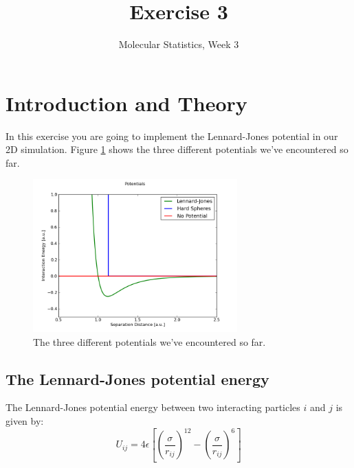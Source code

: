 \documentclass{article}
\title{Exercise 3}
\author{Molecular Statistics, Week 3}
\date{}
\begin{document}

\maketitle


\section{Introduction and Theory}



In this exercise you are going to implement the Lennard-Jones potential in our 2D simulation.
Figure \ref{fig:potentials} shows the three different potentials we've encountered so far.

\begin{figure}[h!]
\begin{center}
    \includegraphics[width=0.7\textwidth]{images/potentials.png}
    \caption{The three different potentials we've encountered so far.}
    \label{fig:potentials}
\end{center}
\end{figure}


\subsection{The Lennard-Jones potential energy}

The Lennard-Jones potential energy between two interacting particles $i$ and $j$ is given by:
\begin{equation}
    U_{ij} = 4 \epsilon \left[ \left(\frac{\sigma}{r_{ij}} \right)^{12} - \left(\frac{\sigma}{r_{ij}} \right)^6 \right]
\end{equation}
\end{document}
